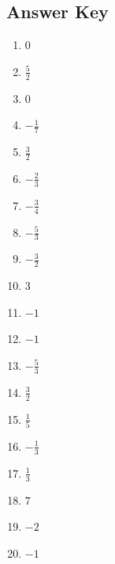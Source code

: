 \documentclass{article}
\begin{document}
\newpage

\subsection*{Answer Key}

\begin{enumerate}
\item $0$ 
\item $\frac{5}{2}$ 
\item $0$ 
\item $- \frac{1}{7}$ 
\item $\frac{3}{2}$ 
\item $- \frac{2}{3}$ 
\item $- \frac{3}{4}$ 
\item $- \frac{5}{3}$ 
\item $- \frac{3}{2}$ 
\item $3$ 
\item $-1$ 
\item $-1$ 
\item $- \frac{5}{3}$ 
\item $\frac{3}{2}$ 
\item $\frac{1}{5}$ 
\item $- \frac{1}{3}$ 
\item $\frac{1}{3}$ 
\item $7$ 
\item $-2$ 
\item $-1$ 

\end{enumerate}
\end{document}
